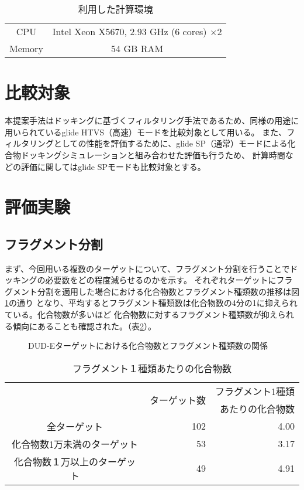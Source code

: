 \begin{table}[htb] \centering
	\caption{利用した計算環境}
	\label{table:computer_node}
	\begin{tabular}{cc}
	\hline
	CPU		&Intel Xeon X5670, 2.93 GHz (6 cores) $\times2$ \\
	Memory	& 54 GB RAM \\ \hline 
	\end{tabular}
\end{table}

\section{比較対象}
本提案手法はドッキングに基づくフィルタリング手法であるため、同様の用途に用いられているglide HTVS（高速）モードを比較対象として用いる。
また、フィルタリングとしての性能を評価するために、glide SP（通常）モードによる化合物ドッキングシミュレーションと組み合わせた評価も行うため、
計算時間などの評価に関してはglide SPモードも比較対象とする。

\section{評価実験}

\subsection{フラグメント分割}\label{subsec:result_decomposition}
まず、今回用いる複数のターゲットについて、フラグメント分割を行うことでドッキングの必要数をどの程度減らせるのかを示す。
それぞれターゲットにフラグメント分割を適用した場合における化合物数とフラグメント種類数の推移は図\ref{fig:dude_decomposition}の通り
となり、平均するとフラグメント種類数は化合物数の4分の1に抑えられている。化合物数が多いほど
化合物数に対するフラグメント種類数が抑えられる傾向にあることも確認された。（表\ref{table:dude_decomposition}）。

\begin{figure}[htp]
 \begin{center}
  \caption{DUD-Eターゲットにおける化合物数とフラグメント種類数の関係}
  \label{fig:dude_decomposition}
 \end{center}
\end{figure}
\begin{table}[htb] \centering
	\caption{フラグメント１種類あたりの化合物数}
	\label{table:dude_decomposition}
	\begin{tabular}{c|rr|}
								&\multirow{2}{*}{ターゲット数}	&フラグメント1種類		\\
								&						&あたりの化合物数		\\ \hline
	全ターゲット					&102		&4.00							\\
	化合物数1万未満のターゲット		&53			&3.17							\\
	化合物数１万以上のターゲット	&49			&4.91							\\ \hline
	\end{tabular}
\end{table}



